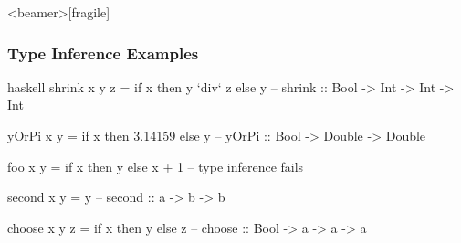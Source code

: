 \documentclass[dvipsnames]{beamer}
\theoremstyle{plain}
\begin{document}
\begin{frame}<beamer>[fragile]
  \frametitle{Type Inference Examples}

  \begin{example}[Haskell]
    \begin{pygments}{haskell}
shrink x y z = if x then y `div` z else y
-- shrink :: Bool -> Int -> Int -> Int

yOrPi x y = if x then 3.14159 else y
-- yOrPi :: Bool -> Double -> Double

foo x y = if x then y else x + 1
-- type inference fails

second x y = y
-- second :: a -> b -> b

choose x y z = if x then y else z
-- choose :: Bool -> a -> a -> a
    \end{pygments}
  \end{example}
\end{frame}
% 
% 
% 
\end{document}
